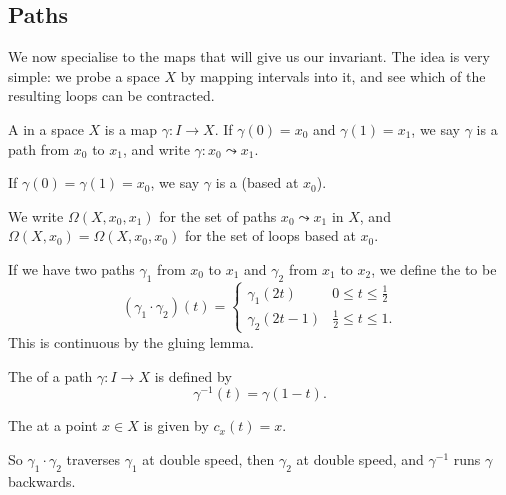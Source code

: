 \documentclass[a4paper]{scrartcl}
\begin{document}
\subsection{Paths}

We now specialise to the maps that will give us our invariant. The idea is very simple:
we probe a space $X$ by mapping intervals into it, and see which of the resulting loops
can be contracted.

\begin{definition}[Path]
	A  in a space $X$ is a map $\gamma: I \rightarrow X$.
	If $\gamma(0) = x_0$ and $\gamma(1) = x_1$, we say $\gamma$ is a path from $x_0$ to $x_1$, and write $\gamma: x_0 \leadsto x_1$.

	If $\gamma(0) = \gamma(1) = x_0$, we say $\gamma$ is a  (based at $x_0$).
\end{definition}

We write $\Omega(X, x_0, x_1)$ for the set of paths $x_0 \leadsto x_1$ in $X$, and
$\Omega(X, x_0) = \Omega(X, x_0, x_0)$ for the set of loops based at $x_0$.

\begin{definition}
	If we have two paths $\gamma_1$ from $x_0$ to $x_1$ and $\gamma_2$ from $x_1$ to $x_2$, we define the  to be
	$$
	(\gamma_1 \cdot \gamma_2)(t) = \begin{cases}
		\gamma_1(2t) & 0 \leq t \leq \frac{1}{2}\\
		\gamma_2(2t - 1) & \frac{1}{2} \leq t \leq 1.
	\end{cases}
	$$
	This is continuous by the gluing lemma.

	The  of a path $\gamma: I \rightarrow X$ is defined by
	$$
	\gamma^{-1}(t) = \gamma(1 -t).
	$$

	The  at a point $x \in X$ is given by $c_x(t) = x$.
\end{definition}

So $\gamma_1 \cdot \gamma_2$ traverses $\gamma_1$ at double speed, then $\gamma_2$ at
double speed, and $\gamma^{-1}$ runs $\gamma$ backwards.

\begin{center}
\end{center}
\end{document}
